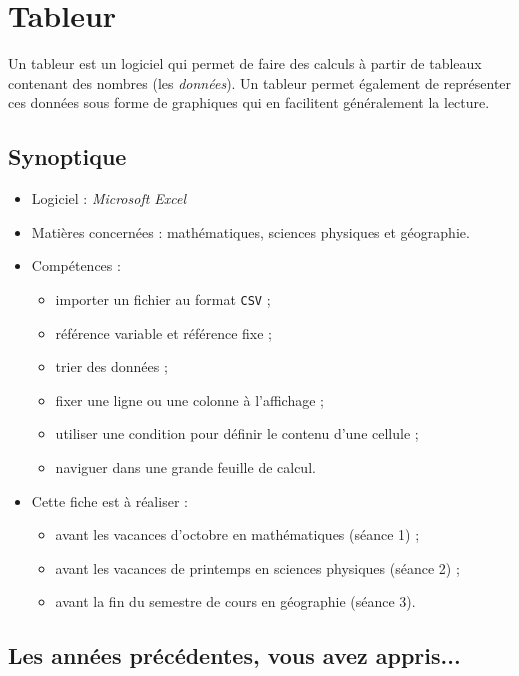 \chapter{Tableur}  

Un tableur est un logiciel qui permet de faire des calculs à partir de tableaux contenant des nombres (les \emph{données}). Un tableur permet également de représenter ces données sous forme de graphiques qui en facilitent généralement la lecture.





\section*{Synoptique}

\begin{itemize}
\item Logiciel : \emph{Microsoft Excel}
\item Matières concernées : mathématiques, sciences physiques et géographie.
\item Compétences : 
        \begin{itemize}
        \item importer un fichier au format \texttt{CSV} ;
        \item référence variable et référence fixe ;
        \item trier des données ;
	\item fixer une ligne ou une colonne à l'affichage ;
	\item utiliser une condition pour définir le contenu d'une cellule ;
	\item naviguer dans une grande feuille de calcul.
        \end{itemize}
\item Cette fiche est à réaliser :
        \begin{itemize}
        \item avant les vacances d'octobre en mathématiques (séance 1) ;
        \item avant les vacances de printemps en sciences physiques (séance 2) ;
        \item avant la fin du semestre de cours en géographie (séance 3). 
        \end{itemize}
\end{itemize}



\section*{Les années précédentes, vous avez appris...}

